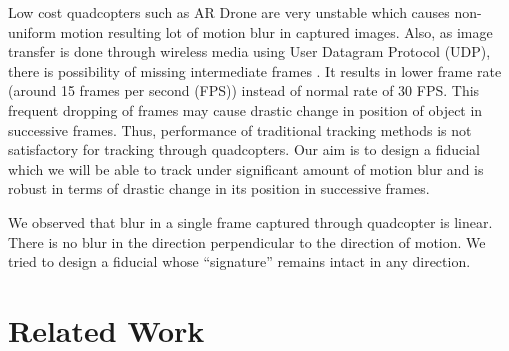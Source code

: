 \documentclass[runningheads]{llncs}
\begin{document}
Low cost quadcopters such as AR Drone are very unstable which causes non-uniform
motion resulting lot of motion blur in captured images. Also, as image transfer
is done through wireless media using User Datagram Protocol (UDP), there is
possibility of missing intermediate frames . It results in lower frame rate
(around 15 frames per second (FPS)) instead of normal rate of 30 FPS. This
frequent dropping of frames may cause drastic change in position of object in
successive frames. Thus, performance of traditional tracking methods is not
satisfactory for tracking through quadcopters. Our aim is to design a fiducial
which we will be able to track under significant amount of motion blur and is
robust in terms of drastic change in its position in successive frames.

We observed that blur in a single frame captured through quadcopter is linear.
There is no blur in the direction perpendicular to the direction of motion. We
tried to design a fiducial whose ``signature'' remains intact in any direction.

 
\section{Related Work}
\end{document}
